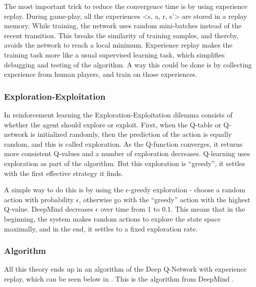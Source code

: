The most important trick to reduce the convergence time is by using experience replay. During game-play, all the experiences <s, a, r, s’> are stored in a replay memory. While training, the network uses random mini-batches instead of the recent transition. This breaks the similarity of training samples, and thereby, avoids the network to reach a local minimum. Experience replay makes the training task more like a usual supervised learning task, which simplifies debugging and testing of the algorithm. A way this could be done is by collecting experience from human players, and train on those experiences.
  
\subsubsection{Exploration-Exploitation}
In reinforcement learning the Exploration-Exploitation dilemma consists of whether the agent should explore or exploit. First, when the Q-table or Q-network is initialized randomly, then the prediction of the action is equally random, and this is called exploration. As the Q-function converges, it returns more consistent Q-values and a number of exploration decreases. Q-learning uses exploration as part of the algorithm. But this exploration is “greedy”, it settles with the first effective strategy it finds. 

A simple way to do this is by using the $\epsilon$-greedy exploration - choose a random action with probability $\epsilon$, otherwise go with the “greedy” action with the highest Q-value. DeepMind decreases $\epsilon$ over time from 1 to 0.1. This means that in the beginning, the system makes random actions to explore the state space maximally, and in the end, it settles to a fixed exploration rate.

\subsubsection{Algorithm}
All this theory ends up in an algorithm of the Deep Q-Network with experience replay, which can be seen below in . This is the algorithm from DeepMind \cite{DBLP:journals/corr/MnihKSGAWR13}.

